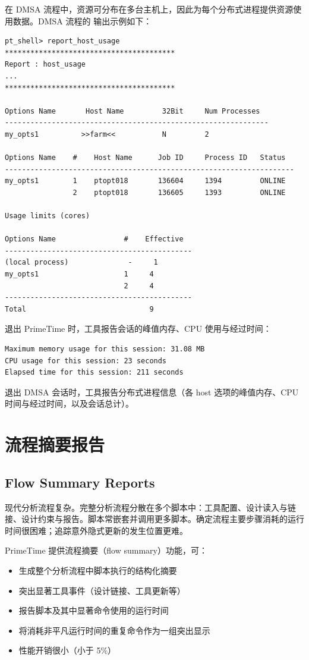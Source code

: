 在 DMSA 流程中，资源可分布在多台主机上，因此为每个分布式进程提供资源使用数据。DMSA 流程的  输出示例如下：
\begin{lstlisting}
pt_shell> report_host_usage
****************************************
Report : host_usage
...
****************************************

Options Name       Host Name         32Bit     Num Processes
--------------------------------------------------------------
my_opts1          >>farm<<           N         2

Options Name    #    Host Name      Job ID     Process ID   Status
--------------------------------------------------------------------
my_opts1        1    ptopt018       136604     1394         ONLINE
                2    ptopt018       136605     1393         ONLINE

Usage limits (cores)

Options Name                #    Effective
--------------------------------------------
(local process)              -     1
my_opts1                    1     4
                            2     4
--------------------------------------------
Total                             9
\end{lstlisting}

退出 PrimeTime 时，工具报告会话的峰值内存、CPU 使用与经过时间：
\begin{lstlisting}
Maximum memory usage for this session: 31.08 MB
CPU usage for this session: 23 seconds
Elapsed time for this session: 211 seconds
\end{lstlisting}

退出 DMSA 会话时，工具报告分布式进程信息（各 host 选项的峰值内存、CPU 时间与经过时间，以及会话总计）。

\section{流程摘要报告}
\subsection*{Flow Summary Reports}

现代分析流程复杂。完整分析流程分散在多个脚本中：工具配置、设计读入与链接、设计约束与报告。脚本常嵌套并调用更多脚本。确定流程主要步骤消耗的运行时间很困难；追踪意外隐式更新的发生位置更难。

PrimeTime 提供流程摘要（flow summary）功能，可：
\begin{itemize}
  \item 生成整个分析流程中脚本执行的结构化摘要
  \item 突出显著工具事件（设计链接、工具更新等）
  \item 报告脚本及其中显著命令使用的运行时间
  \item 将消耗非平凡运行时间的重复命令作为一组突出显示
  \item 性能开销很小（小于 5\%）
\end{itemize}

